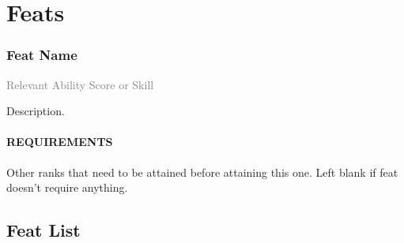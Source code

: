 \section{Feats}




\subsubsection{Feat Name}
\small{\textcolor{gray}{Relevant Ability Score or Skill}}

\normalsize
Description.
\paragraph{REQUIREMENTS} Other ranks that need to be attained before attaining this one.
Left blank if feat doesn't require anything.

\subsection*{Feat List}


% 
% 
% 


